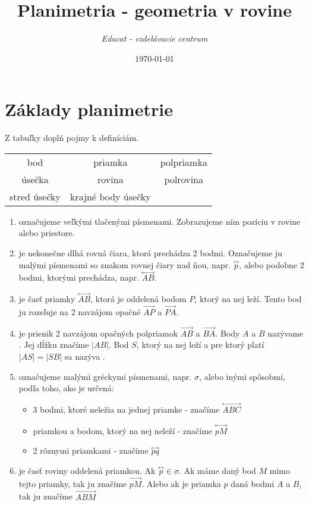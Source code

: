 \documentclass[12pt, twopage]{article}
\title{\textbf{Planimetria - geometria v rovine}}
\date{\today}
\author{\textit{Educat - vzdelávacie centrum}}
\theoremstyle{definition}
\newcommand{\blank}
{\underline{\hspace{4cm}}}
\newcommand{\overarrow}[1]
{\overset{\longleftrightarrow}{#1}}
\begin{document}
	\maketitle
	
	\section{Základy planimetrie}
	
	Z tabuľky doplň pojmy k definíciám.
	\begin{center}
		\begin{tabular}{|ccc|}
			\hline
			bod & priamka & polpriamka \\
			úsečka & rovina & polrovina \\
			stred úsečky & krajné body úsečky& \\
			\hline
		\end{tabular}
	\end{center}
	
	\begin{enumerate}
		\item \blank označujeme veľkými tlačenými písmenami. Zobrazujeme ním pozíciu v rovine alebo priestore.
		
		\item \blank je nekonečne dlhá rovná čiara, ktorá prechádza 2 bodmi. Označujeme ju malými písmenami so znakom rovnej čiary nad ňou, napr. $\overarrow{p}$, alebo podobne 2 bodmi, ktorými prechádza, napr. $\overarrow{AB}$.
		
		\item \blank je časť priamky $\overarrow{AB}$, ktorá je oddelená bodom $P$, ktorý na nej leží. Tento bod ju rozeľuje na 2 navzájom opačné \blank $\overrightarrow{AP}$ a $\overrightarrow{PA}$.
		
		\item \blank je prienik 2 navzájom opačných polpriamok $\overrightarrow{AB}$ a $\overrightarrow{BA}$. Body $A$ a $B$ nazývame \blank. Jej dĺžku značíme $|AB|$. Bod $S$, ktorý na nej leží a pre ktorý platí $|AS| = |SB|$ sa nazýva \blank.
		
		\item \blank označujeme malými gréckymi písmenami, napr. $\sigma$, alebo inými spôsobmi, podľa toho, ako je určená:
		\begin{itemize}
			\item 3 bodmi, ktoré neležia na jednej priamke - značíme $\overarrow{ABC}$
			\item priamkou a bodom, ktorý na nej neleží - značíme $\overarrow{pM}$
			\item 2 rôznymi priamkami - značíme $\overarrow{pq}$
		\end{itemize}
		
		\item \blank je časť roviny oddelená priamkou. Ak $\overarrow{p} \in \sigma$. Ak máme daný bod $M$ mimo tejto priamky, tak ju značíme $\overrightarrow{pM}$. Alebo ak je priamka $p$ daná bodmi $A$ a $B$, tak ju značíme $\overrightarrow{ABM}$ 
		
		
	\end{enumerate}
	
\end{document}
